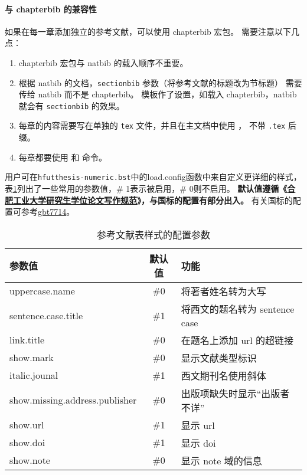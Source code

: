 \documentclass[a4paper]{ltxdoc}
\DeclareRobustCommand\file{\nolinkurl}
\DeclareRobustCommand\pkg{\textsf}
\DeclareRobustCommand\opt{\texttt}
\begin{document}
\paragraph{与 \pkg{chapterbib} 的兼容性}
如果在每一章添加独立的参考文献，可以使用 \pkg{chapterbib} 宏包。
需要注意以下几点：
\begin{enumerate}
  \item \pkg{chapterbib} 宏包与 \pkg{natbib} 的载入顺序不重要。
  \item 根据 \pkg{natbib} 的文档，\opt{sectionbib} 参数（将参考文献的标题改为节标题）
    需要传给 \pkg{natbib} 而不是 \pkg{chapterbib}。
    模板作了设置，如载入 \pkg{chapterbib}，\pkg{natbib} 就会有 \opt{sectionbib} 的效果。
  \item 每章的内容需要写在单独的 \file{tex} 文件，并且在主文档中使用 ，
    不带 \file{.tex} 后缀。
  \item 每章都要使用  和  命令。
\end{enumerate}

用户可在\file{hfutthesis-numeric.bst}中的load.config函数中来自定义更详细的样式，表\ref{canshu}列出了一些常用的参数值，\# 1表示被启用，\# 0则不启用。
\textbf{默认值遵循《\href{http://xwgl.hfut.edu.cn/2021/0419/c1975a253949/page.htm}{合肥工业大学研究生学位论文写作规范}》，与国标的配置有部分出入。}
有关国标的配置可参考\href{https://ctan.org/pkg/gbt7714}{\pkg{gbt7714}}。

\begin{table}
  \caption{参考文献表样式的配置参数}\label{canshu}
  \begin{tabular}{lcl}
    \hline 参数值 & 默认值 & 功能 \\
    \hline uppercase.name & \#0 & 将著者姓名转为大写 \\
     sentence.case.title & \#1 & 将西文的题名转为 sentence case \\
    link.title &\#0 & 在题名上添加 url 的超链接 \\
    show.mark & \#0 & 显示文献类型标识 \\
    italic.jounal & \#1 & 西文期刊名使用斜体 \\
    show.missing.address.publisher & \#0 & 出版项缺失时显示“出版者不详” \\
    show.url & \#1 & 显示 url \\
    show.doi & \#1 & 显示 doi \\
    show.note & \#0 & 显示 note 域的信息 \\
    \hline
    \end{tabular}
\end{table}
\end{document}
